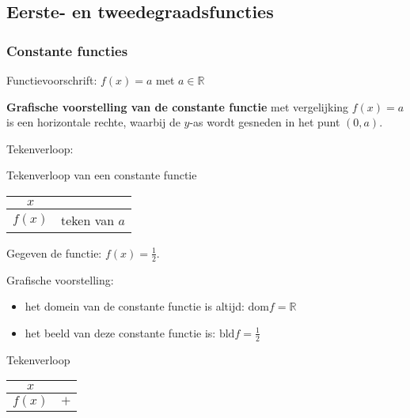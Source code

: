 \subsection{Eerste- en tweedegraadsfuncties}
\label{sec:eerste_tweede}

\subsubsection{Constante functies}

\begin{definitie}
	Functievoorschrift: $f(x)=a$ met $a\in\mathbb{R}$
\end{definitie}


\textbf{Grafische voorstelling van de constante functie}
met vergelijking $f(x)=a$ is een horizontale rechte, waarbij de $y$-as
wordt gesneden in het punt $(0,a)$.


Tekenverloop: 

\begin{tabel}{Tekenverloop van een constante functie}
	\begin{tabular}{c||c}
		$x$ & \\
		\hline 
		$f(x)$ & teken van $a$\\
	\end{tabular}
	\label{tab:ct}
\end{tabel}


\begin{voorbeeld}
	Gegeven de functie: $f(x)=\frac{1}{2}$. 
	

Grafische voorstelling:
\begin{itemize}
\item het domein van de constante functie is altijd: $\textrm{dom}f=\mathbb{R}$
\item het beeld van deze constante functie is: $\textrm{bld}f=\frac{1}{2}$
\end{itemize}

Tekenverloop

\begin{center}
\begin{tabular}{c||c}
	$x$ & \\
	\hline 
	$f(x)$ & $+$ \\
\end{tabular}	
\end{center}

\end{voorbeeld}

